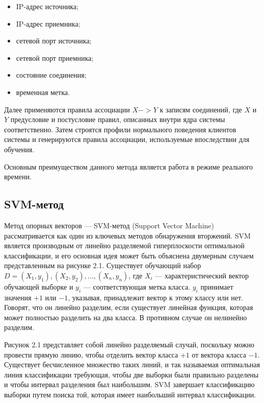 \begin{itemize}
    \item IP-адрес источника;
    \item IP-адрес приемника;
    \item сетевой порт источника;
    \item сетевой порт приемника;
    \item состояние соединения;
    \item временная метка.
\end{itemize}

Далее применяются правила ассоциации $X -> Y$ к записям соединений, где $X$ и $Y$ предусловие и постусловие правил, описанных внутри ядра системы соответственно. 
Затем строятся профили нормального поведения клиентов системы и генерируются правила ассоциации, используемые впоследствии для обучения.

Основным преимуществом данного метода является работа в режиме реального времени.


\subsection*{SVM-метод}

Метод опорных векторов --- SVM-метод (Support Vector Machine) \cite{eleven} рассматривается как один из ключевых методов обнаружения вторжений. 
SVM является производным от линейно разделяемой гиперплоскости оптимальной классификации, и его основная идея может быть объяснена двумерным случаем представленным на рисунке 2.1.
Существует обучающий набор $D = {(X_1, y_1), (X_2, y_2),...,(X_n, y_n)}$, где $X_i$ --- характеристический вектор обучающей выборке и $y_i$ --- соответствующая метка класса. $y_i$ принимает значения $+1$ или $-1$, указывая, принадлежит вектор к этому классу или нет. Говорят, что он линейно разделим, если существует линейная функция, которая может полностью разделить на два класса. В противном случае он нелинейно разделим.

Рисунок 2.1 представляет собой линейно разделяемый случай, поскольку можно провести прямую линию, чтобы отделить вектор класса $+1$ от вектора класса $-1$.
Существует бесчисленное множество таких линий, и так называемая оптимальная линия классификации требующая, чтобы две выборки были правильно разделены и чтобы интервал разделения был наибольшим. SVM завершает классификацию выборки путем поиска той, которая имеет наибольший интервал классификации.


